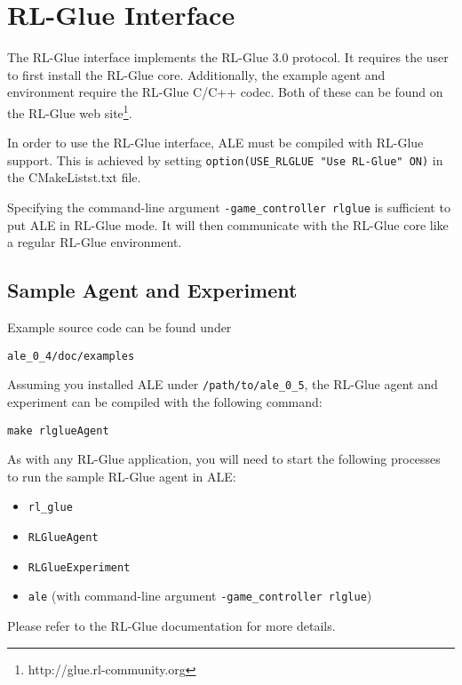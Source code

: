 \documentclass[12pt]{article}
\begin{document}
\section{RL-Glue Interface}\label{sec:rlglue_interface}

The RL-Glue interface implements the RL-Glue 3.0 protocol.
It requires the user to first install the RL-Glue core. Additionally, the example agent and 
environment require the RL-Glue C/C++ codec. Both of these can be found on the RL-Glue web
site\footnote{http://glue.rl-community.org}.

In order to use the RL-Glue interface, ALE must be compiled with RL-Glue support. This is achieved
by setting \verb+option(USE_RLGLUE "Use RL-Glue" ON)+ in the CMakeListst.txt file.

Specifying the command-line argument \verb+-game_controller rlglue+ is sufficient to put ALE in 
RL-Glue mode. It will then communicate with the RL-Glue core like a regular RL-Glue environment.

\subsection{Sample Agent and Experiment}

Example source code can be found under

\begin{verbatim}
ale_0_4/doc/examples
\end{verbatim}

Assuming you installed ALE under \verb+/path/to/ale_0_5+, the RL-Glue agent and experiment
can be compiled with the following command: 

\begin{verbatim}
make rlglueAgent 
\end{verbatim}

As with any RL-Glue application, you will need to start the following processes to run the
sample RL-Glue agent in ALE:

\begin{itemize}
  \item{\verb+rl_glue+} 
  \item{\verb+RLGlueAgent+}
  \item{\verb+RLGlueExperiment+}
  \item{\verb+ale+ (with command-line argument \verb+-game_controller rlglue+)}
\end{itemize}

Please refer to the RL-Glue documentation for more details. 
\end{document}

